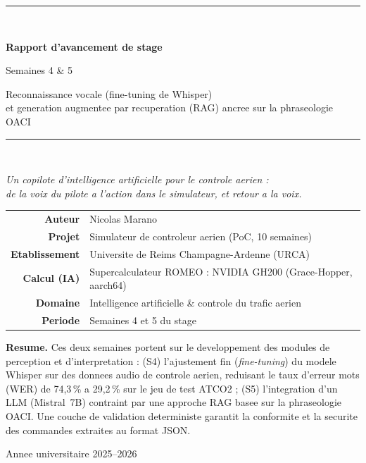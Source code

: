 \documentclass[11pt,a4paper]{article}
\begin{document}
\begin{titlepage}
\centering
\vspace*{1.2cm}
{\color{atcblue}\rule{\textwidth}{2pt}}\\[0.5cm]
{\Huge\bfseries\color{atcblue} Rapport d'avancement de stage\par}
\vspace{0.35cm}
{\LARGE\color{atcteal} Semaines 4 \& 5\par}
\vspace{0.25cm}
{\large Reconnaissance vocale (fine-tuning de Whisper) \\[2pt]
et generation augmentee par recuperation (RAG) ancree sur la phraseologie OACI\par}
\vspace{0.4cm}
{\color{atcblue}\rule{\textwidth}{2pt}}\\[1.0cm]

{\large\itshape Un copilote d'intelligence artificielle pour le controle aerien :\\
de la voix du pilote a l'action dans le simulateur, et retour a la voix.\par}
\vspace{1.6cm}

\begin{tabular}{rl}
\large\bfseries Auteur & \large Nicolas Marano\\[4pt]
\large\bfseries Projet & \large Simulateur de controleur aerien (PoC, 10 semaines)\\[4pt]
\large\bfseries Etablissement & \large Universite de Reims Champagne-Ardenne (URCA)\\[4pt]
\large\bfseries Calcul (IA) & \large Supercalculateur ROMEO : NVIDIA GH200 (Grace-Hopper, aarch64)\\[4pt]
\large\bfseries Domaine & \large Intelligence artificielle \& controle du trafic aerien\\[4pt]
\large\bfseries Periode & \large Semaines 4 et 5 du stage\\
\end{tabular}

\vfill
\begin{tcolorbox}[colback=lightgray, colframe=atcblue, arc=3pt, width=0.92\textwidth, center,
  left=12pt, right=12pt, top=8pt, bottom=8pt]
\small\centering
\textbf{Resume.} Ces deux semaines portent sur le developpement des modules de
perception et d'interpretation : (S4) l'ajustement fin (\emph{fine-tuning}) du
modele Whisper sur des donnees audio de controle aerien, reduisant le taux d'erreur
mots (WER) de 74,3\,\% a 29,2\,\% sur le jeu de test ATCO2 ; (S5) l'integration d'un
LLM (Mistral~7B) contraint par une approche RAG basee sur la phraseologie OACI. Une
couche de validation deterministe garantit la conformite et la securite des
commandes extraites au format JSON.
\end{tcolorbox}
\vspace{0.6cm}
{\small Annee universitaire 2025--2026}
\end{titlepage}
\end{document}
